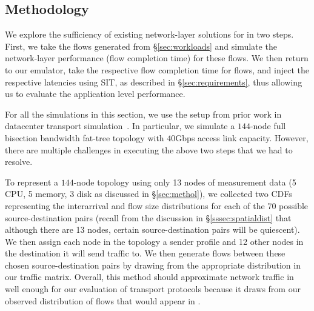 \subsection{Methodology}
\label{ssec:ssmethod}
We explore the sufficiency of existing network-layer solutions for \dis in two steps. First, we take the flows generated from \S\ref{sec:workloads} and simulate the network-layer performance (flow completion time) for these flows. We then return to our emulator, take the respective flow completion time for flows, and inject the respective latencies using SIT, as described in \S\ref{sec:requirements}, thus allowing us to evaluate the application level performance. 

For all the simulations in this section, we use the setup from prior work in datacenter transport simulation~\cite{pfabric, phost}. In particular, we simulate a $144$-node full bisection bandwidth fat-tree topology with $40$Gbps access link capacity.  However, there are multiple challenges in executing the above two steps that we had to resolve.

To represent a $144$-node topology using only 13 nodes of measurement data (5 CPU, 5 memory, 3 disk as discussed in \S\ref{sec:methol}), we collected two CDFs representing the interarrival and flow size distributions for each of the 70 possible source-destination pairs (recall from the discussion in \S\ref{sssec:spatialdist} that although there are 13 nodes, certain source-destination pairs will be quiescent). We then assign each node in the topology a sender profile and 12 other nodes in the destination it will send traffic to. We then generate flows between these chosen source-destination pairs by drawing from the appropriate distribution in our traffic matrix. Overall, this method should approximate network traffic in \dis well enough for our evaluation of transport protocols because it draws from our observed distribution of flows that would appear in \dis.

